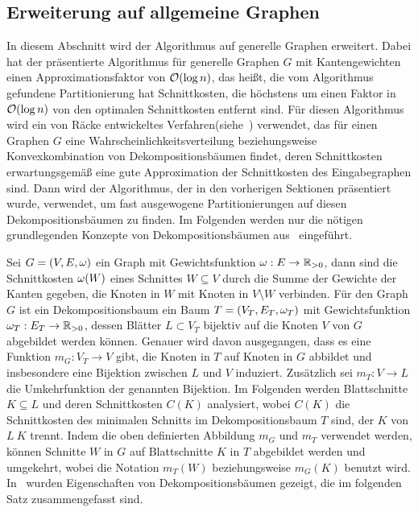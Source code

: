 \subsection{Erweiterung auf allgemeine Graphen}\label{sec:decomptrees}
In diesem Abschnitt wird der Algorithmus auf generelle Graphen erweitert.
Dabei hat der präsentierte Algorithmus für generelle Graphen $G$ mit Kantengewichten einen Approximationsfaktor von $\mathcal{O}(\log n)$, das heißt, die vom Algorithmus gefundene Partitionierung hat Schnittkosten, die höchstens um einen Faktor in $\mathcal{O}(\log n)$ von den optimalen Schnittkosten entfernt sind.
Für diesen Algorithmus wird ein von Räcke entwickeltes Verfahren(siehe~\parencite{rc08}) verwendet, das für einen Graphen $G$ eine Wahrscheinlichkeitsverteilung beziehungsweise Konvexkombination von Dekompositionsbäumen findet, deren Schnittkosten erwartungsgemäß eine gute Approximation der Schnittkosten des Eingabegraphen sind. 
Dann wird der Algorithmus, der in den vorherigen Sektionen präsentiert wurde, verwendet, um fast ausgewogene Partitionierungen auf diesen Dekompositionsbäumen zu finden.
Im Folgenden werden nur die nötigen grundlegenden Konzepte von Dekompositionsbäumen aus~\parencite{rc08} eingeführt.

Sei $G = (V, E, \omega)$ ein Graph mit Gewichtsfunktion $\omega : E \rightarrow \mathbb{R}_{> 0}$, dann sind die Schnittkosten $\omega(W)$ eines Schnittes $W \subseteq V$ durch die Summe der Gewichte der Kanten gegeben, die Knoten in $W$ mit Knoten in $V \setminus W$ verbinden.
Für den Graph $G$ ist ein Dekompositionsbaum ein Baum $T=(V_T, E_T, \omega_T)$ mit Gewichtsfunktion $\omega_T : E_T \rightarrow \mathbb{R}_{> 0}$, dessen Blätter $L \subset V_T$ bijektiv auf die Knoten $V$ von $G$ abgebildet werden können.
Genauer wird davon ausgegangen, dass es eine Funktion $m_G : V_T \rightarrow V$ gibt, die Knoten in $T$ auf Knoten in $G$ abbildet und insbesondere eine Bijektion zwischen $L$ und $V$ induziert. 
Zusätzlich sei $m_T : V \rightarrow L$ die Umkehrfunktion der genannten Bijektion.
Im Folgenden werden Blattschnitte $K \subseteq L$ und deren Schnittkosten $C(K)$ analysiert, wobei $C(K)$ die Schnittkosten des minimalen Schnitts im Dekompositionsbaum $T$ sind, der $K$ von $L \ K$ trennt.
Indem die oben definierten Abbildung $m_G$ und $m_T$ verwendet werden, können Schnitte $W$ in $G$ auf Blattschnitte $K$ in $T$ abgebildet werden und umgekehrt, wobei die Notation $m_T(W)$ beziehungsweise $m_G(K)$ benutzt wird.
In~\parencite{rc08} wurden Eigenschaften von Dekompositionsbäumen gezeigt, die im folgenden Satz zusammengefasst sind.

